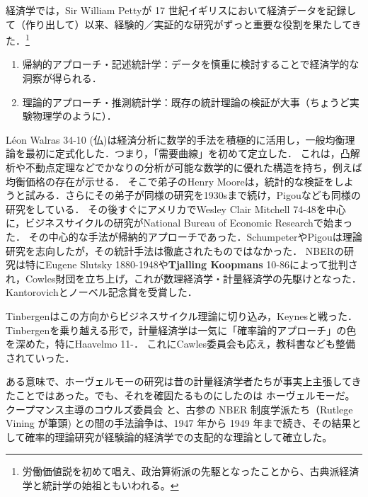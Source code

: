 \documentclass[uplatex,dvipdfmx]{jsreport}
\begin{document}
\begin{history}
    経済学では，Sir William Pettyが 17 世紀イギリスにおいて経済データを記録して（作り出して）以来、経験的／実証的な研究がずっと重要な役割を果たしてきた．\footnote{労働価値説を初めて唱え、政治算術派の先駆となったことから、古典派経済学と統計学の始祖ともいわれる。}
    \begin{enumerate}
        \item 帰納的アプローチ・記述統計学：データを慎重に検討することで経済学的な洞察が得られる．
        \item 理論的アプローチ・推測統計学：既存の統計理論の検証が大事（ちょうど実験物理学のように）．
    \end{enumerate}
    Léon Walras 34-10 (仏)は経済分析に数学的手法を積極的に活用し，一般均衡理論を最初に定式化した．つまり，「需要曲線」を初めて定立した．
    これは，凸解析や不動点定理などでかなりの分析が可能な数学的に優れた構造を持ち，例えば均衡価格の存在が示せる．
    そこで弟子のHenry Mooreは，統計的な検証をしようと試みる．さらにその弟子が同様の研究を1930sまで続け，Pigouなども同様の研究をしている．
    その後すぐにアメリカでWesley Clair Mitchell 74-48を中心に，ビジネスサイクルの研究がNational Bureau of Economic Researchで始まった．
    その中心的な手法が帰納的アプローチであった．SchumpeterやPigouは理論研究を志向したが，その統計手法は徹底されたものではなかった．
    NBERの研究は特にEugene Slutsky 1880-1948や\textbf{Tjalling Koopmans} 10-86によって批判され，Cowles財団を立ち上げ，これが数理経済学・計量経済学の先駆けとなった．
    Kantorovichとノーベル記念賞を受賞した．
\end{history}

\begin{history}[Haavelmoによる確率論的アプローチによるCawles財団の加速]
    Tinbergenはこの方向からビジネスサイクル理論に切り込み，Keynesと戦った．
    Tinbergenを乗り越える形で，計量経済学は一気に「確率論的アプローチ」の色を深めた，特にHaavelmo 11-．
    これにCawles委員会も応え，教科書なども整備されていった．

    ある意味で、ホーヴェルモーの研究は昔の計量経済学者たちが事実上主張してきたことではあった。でも、それを確固たるものにしたのは ホーヴェルモーだ。クープマンス主導のコウルズ委員会 と、古参の NBER 制度学派たち（Rutlege Vining が筆頭) との間の手法論争は、1947 年から 1949 年まで続き、その結果として確率的理論研究が経験論的経済学での支配的な理論として確立した。
\end{history}
\end{document}

